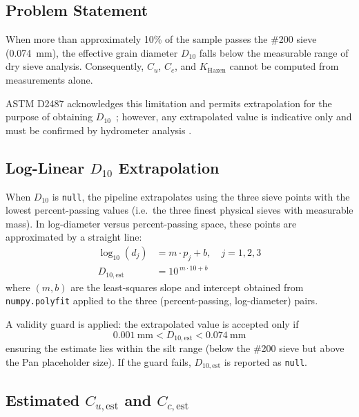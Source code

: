 \documentclass[12pt,a4paper]{article}
\begin{document}
\subsection{Problem Statement}

When more than approximately 10\% of the sample passes the \#200 sieve
(\SI{0.074}{\milli\metre}), the effective grain diameter $D_{10}$ falls below
the measurable range of dry sieve analysis.  Consequently, $C_u$, $C_c$, and
$K_{\mathrm{Hazen}}$ cannot be computed from measurements alone.

ASTM D2487 acknowledges this limitation and permits extrapolation for the
purpose of obtaining $D_{10}$~\citep{astm_d2487}; however, any extrapolated
value is indicative only and must be confirmed by hydrometer analysis
\citep{astm_d7928}.

\subsection{Log-Linear \texorpdfstring{$D_{10}$}{D10} Extrapolation}
\label{sec:d10est}

When $D_{10}$ is \texttt{null}, the pipeline extrapolates using the three sieve
points with the lowest percent-passing values (i.e.\ the three finest physical
sieves with measurable mass).  In log-diameter versus percent-passing space,
these points are approximated by a straight line:
\begin{align}
    \log_{10}(d_j) &= m \cdot p_j + b, \quad j = 1, 2, 3
    \label{eq:linreg} \\
    D_{10,\mathrm{est}} &= 10^{\,m \cdot 10 + b}
    \label{eq:d10est}
\end{align}
where $(m, b)$ are the least-squares slope and intercept obtained from
\texttt{numpy.polyfit} applied to the three (percent-passing, log-diameter)
pairs.

A validity guard is applied: the extrapolated value is accepted only if
\begin{equation}
    \SI{0.001}{\milli\metre} < D_{10,\mathrm{est}} < \SI{0.074}{\milli\metre}
    \label{eq:d10est_validity}
\end{equation}
ensuring the estimate lies within the silt range (below the \#200 sieve but
above the Pan placeholder size).  If the guard fails, $D_{10,\mathrm{est}}$
is reported as \texttt{null}.

\subsection{Estimated \texorpdfstring{$C_{u,\mathrm{est}}$}{Cu\_est} and
            \texorpdfstring{$C_{c,\mathrm{est}}$}{Cc\_est}}
\end{document}
